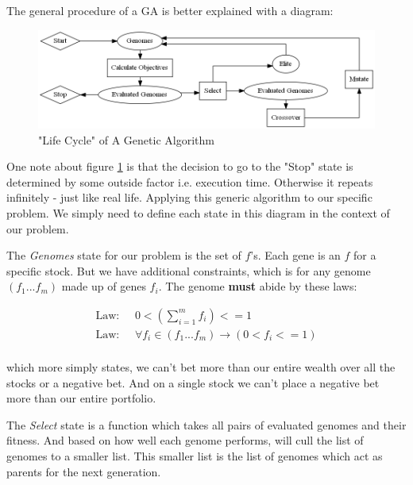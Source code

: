 \documentclass[11pt]{article}
\begin{document}
    The general procedure of a GA is better explained with a diagram:

    \begin{figure}[h] %
        \centering
        \includegraphics[width=\textwidth]{GA}
        \caption{"Life Cycle" of A Genetic Algorithm}\label{fig:GA}
    \end{figure}

    One note about figure \ref{fig:GA} is that the decision to go to the "Stop"
    state is determined by some outside factor i.e. execution time. Otherwise
    it repeats infinitely - just like real life. Applying this generic algorithm to 
    our specific problem. We simply need to
    define each state in this diagram in the context of our problem.

    The \textit{Genomes} state for our problem is the set of \(f\)'s. Each gene is an
    \(f\) for a specific stock. But we have additional constraints, which is for 
    any genome \((f_1...f_m)\) made up of genes \(f_i\). The genome \textbf{must}
    abide by these laws:

    \begin{align*}
        \text{Law: } & \;
        0 < \left(
            \displaystyle\sum^{m}_{i=1} f_i
        \right) <= 1 \\
        \text{Law: } & \;
        \forall f_i \in (f_1...f_m) \to \left(
            0 < f_i <= 1
        \right) \\
    \end{align*}

    which more simply states, we can't bet more than our entire wealth over all the stocks or
    a negative bet. And on a single stock we can't place a negative bet more than our
    entire portfolio.

    The \textit{Select} state is a function which takes all pairs of evaluated genomes
    and their fitness. And based on how well each genome performs, will cull the
    list of genomes to a smaller list. This smaller list is the list of genomes
    which act as parents for the next generation.
\end{document}
